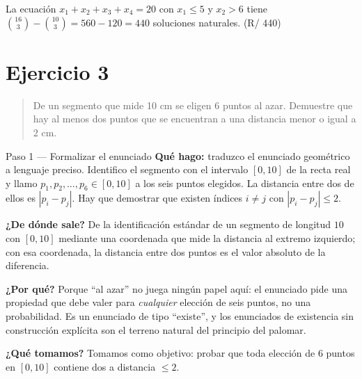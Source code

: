 \documentclass[11pt]{article}
\begin{document}
\begin{resp}
La ecuación $x_1+x_2+x_3+x_4=20$ con $x_1\le 5$ y $x_2>6$ tiene
$\binom{16}{3}-\binom{10}{3}=560-120=440$ soluciones naturales. \hfill (R/ 440)
\end{resp}

\section*{Ejercicio 3}

\begin{quote}
De un segmento que mide 10 cm se eligen 6 puntos al azar. Demuestre que hay al menos dos puntos que
se encuentran a una distancia menor o igual a 2 cm.
\end{quote}

\begin{paso}{Paso 1 --- Formalizar el enunciado}
\textbf{Qué hago:} traduzco el enunciado geométrico a lenguaje preciso. Identifico el segmento con el
intervalo $[0,10]$ de la recta real y llamo $p_1,p_2,\dots ,p_6\in[0,10]$ a los seis puntos elegidos.
La distancia entre dos de ellos es $|p_i-p_j|$. Hay que demostrar que existen índices $i\ne j$ con
$|p_i-p_j|\le 2$.

\textbf{¿De dónde sale?} De la identificación estándar de un segmento de longitud $10$ con $[0,10]$
mediante una coordenada que mide la distancia al extremo izquierdo; con esa coordenada, la distancia
entre dos puntos es el valor absoluto de la diferencia.

\textbf{¿Por qué?} Porque ``al azar'' no juega ningún papel aquí: el enunciado pide una propiedad que
debe valer para \emph{cualquier} elección de seis puntos, no una probabilidad. Es un enunciado de tipo
``existe'', y los enunciados de existencia sin construcción explícita son el terreno natural del
principio del palomar.

\textbf{¿Qué tomamos?} Tomamos como objetivo: probar que toda elección de $6$ puntos en $[0,10]$
contiene dos a distancia $\le 2$.
\end{paso}
\end{document}
